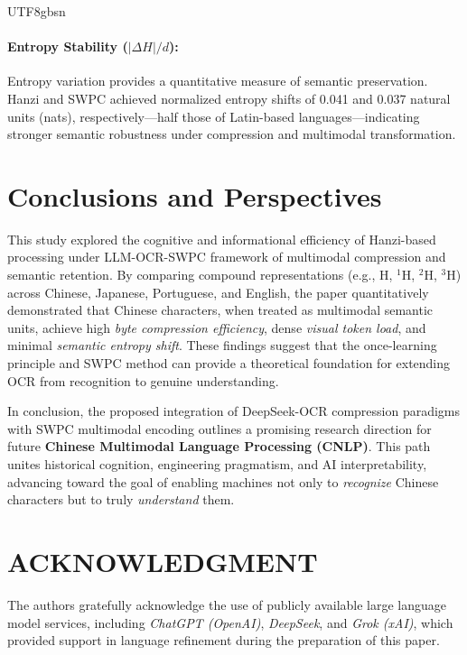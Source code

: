 \documentclass[conference]{IEEEtran}
\begin{document}
\begin{CJK*}{UTF8}{gbsn}
\paragraph{Entropy Stability ($|\Delta H|/d$):}  
Entropy variation provides a quantitative measure of semantic preservation.  
Hanzi and SWPC achieved normalized entropy shifts of 0.041 and 0.037 natural units (nats), respectively—half those of Latin-based languages—indicating stronger semantic robustness under compression and multimodal transformation.


\section{Conclusions and Perspectives}
\label{sec:conclusion}

This study explored the cognitive and informational efficiency of Hanzi-based processing under LLM-OCR-SWPC  framework of multimodal compression and semantic retention. By comparing compound representations (e.g., H, $^{1}$H, $^{2}$H, $^{3}$H) across Chinese, Japanese, Portuguese, and English, the paper quantitatively demonstrated that Chinese characters, when treated as multimodal semantic units, achieve high \textit{byte compression efficiency}, dense \textit{visual token load}, and minimal \textit{semantic entropy shift}. These findings suggest that the once-learning principle and SWPC method can provide a theoretical foundation for extending OCR from recognition to genuine understanding.

In conclusion, the proposed integration of DeepSeek-OCR compression paradigms with SWPC multimodal encoding outlines a promising research direction for future \textbf{Chinese Multimodal Language Processing (CNLP)}. This path unites historical cognition, engineering pragmatism, and AI interpretability, advancing toward the goal of enabling machines not only to \textit{recognize} Chinese characters but to truly \textit{understand} them.


\section*{ACKNOWLEDGMENT}
The authors gratefully acknowledge the use of publicly available large language model services, including \textit{ChatGPT (OpenAI)}, \textit{DeepSeek}, and \textit{Grok (xAI)}, which provided support in language refinement during the preparation of this paper. 



\end{CJK*}
\end{document}

